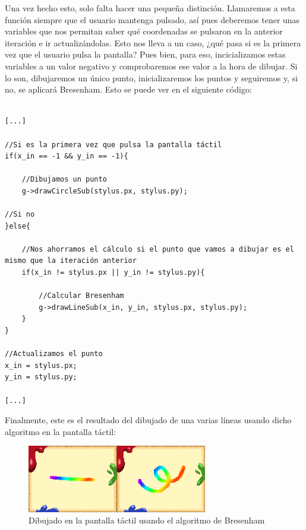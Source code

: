 \vspace{0.5cm}

Una vez hecho esto, solo falta hacer una pequeña distinción. Llamaremos a esta función siempre que el usuario mantenga pulsado, así pues deberemos tener unas variables que nos permitan saber qué coordenadas se pulsaron en la anterior iteración e ir actualizándolas. Esto nos lleva a un caso, ¿qué pasa si es la primera vez que el usuario pulsa la pantalla? Pues bien, para eso, incicializamos estas variables a un valor negativo y comprobaremos ese valor a la hora de dibujar. Si lo son, dibujaremos un único punto, inicializaremos los puntos y seguiremos y, si no, se aplicará Bresenham. Esto se puede ver en el siguiente código:

\vspace{0.5cm}

\begin{lstlisting}[caption={Llamada a Bresenham}, label={code:bresenham_call}]

[...]

//Si es la primera vez que pulsa la pantalla táctil
if(x_in == -1 && y_in == -1){

    //Dibujamos un punto
    g->drawCircleSub(stylus.px, stylus.py);

//Si no
}else{

    //Nos ahorramos el cálculo si el punto que vamos a dibujar es el mismo que la iteración anterior
    if(x_in != stylus.px || y_in != stylus.py){
    
        //Calcular Bresenham
        g->drawLineSub(x_in, y_in, stylus.px, stylus.py);
    }
}

//Actualizamos el punto
x_in = stylus.px;
y_in = stylus.py;

[...]

\end{lstlisting}

\vspace{0.5cm}

Finalmente, este es el resultado del dibujado de una varias líneas usando dicho algoritmo en la pantalla táctil: 

\vspace{0.5cm}

\begin{figure}[htbp]
\centering
  \includegraphics[width=0.7\textwidth]{archivos/sub_draw_bresenham.png}
  \caption{Dibujado en la pantalla táctil usando el algoritmo de Bresenham}
  \label{fig:sub_draw_bresenham}
\end{figure}

